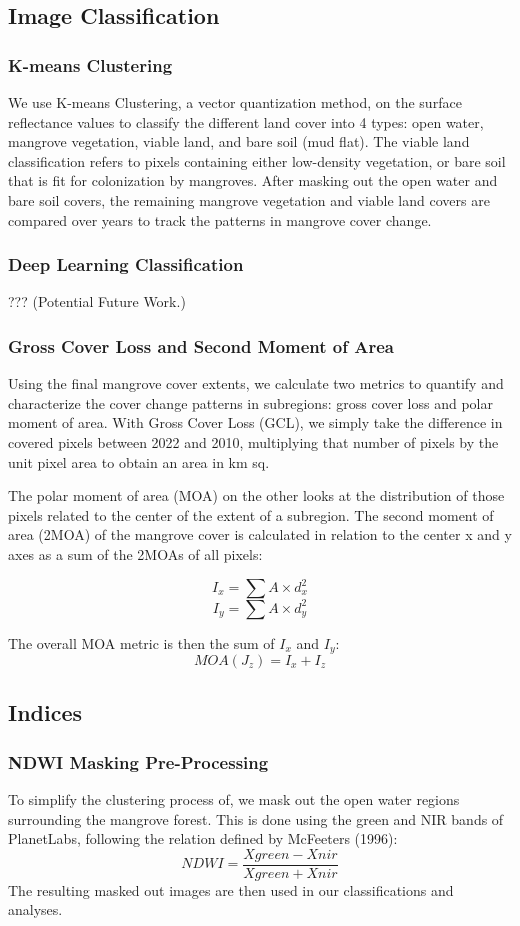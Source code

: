 \documentclass[journal,article,submit,pdftex,moreauthors]{Definitions/mdpi}
\begin{document}
\subsection{Image Classification}
\subsubsection{K-means Clustering}
We use K-means Clustering, a vector quantization method, on the surface reflectance values to classify the different land cover into 4 types: open water, mangrove vegetation, viable land, and bare soil (mud flat). The viable land classification refers to pixels containing either low-density vegetation, or bare soil that is fit for colonization by mangroves. After masking out the open water and bare soil covers, the remaining mangrove vegetation and viable land covers are compared over years to track the patterns in mangrove cover change.

\subsubsection{Deep Learning Classification}
??? (Potential Future Work.)
\subsubsection{Gross Cover Loss and Second Moment of Area}
Using the final mangrove cover extents, we calculate two metrics to quantify and characterize the cover change patterns in subregions: gross cover loss and polar moment of area.
With Gross Cover Loss (GCL), we simply take the difference in covered pixels between 2022 and 2010, multiplying that number of pixels by the unit pixel area to obtain an area in km sq. 

The polar moment of area (MOA) on the other looks at the distribution of those pixels related to the center of the extent of a subregion. The second moment of area (2MOA) of the mangrove cover is calculated in relation to the center x and y axes as a sum of the 2MOAs of all pixels:

\[I_x = \sum{A\times d_x^2} \] 
\[I_y = \sum{A\times d_y^2} \]

The overall MOA metric is then the sum of $I_{x}$ and $I_{y}$:
\[MOA (J_z) = I_x + I_z \]

\subsection{Indices}
\subsubsection{NDWI Masking Pre-Processing}
To simplify the clustering process of, we mask out the open water regions surrounding the mangrove forest. This is done using the green and NIR bands of PlanetLabs, following the relation defined by McFeeters (1996):
\[NDWI = \frac {Xgreen - Xnir}{Xgreen + Xnir} \]
The resulting masked out images are then used in our classifications and analyses.
\end{document}
